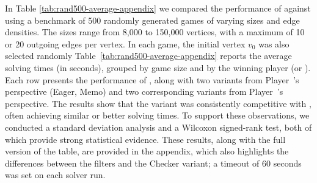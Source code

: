\documentclass[runningheads]{llncs}
\begin{document}
In Table \ref{tab:rand500-average-appendix} we compared the performance of \noc against \zra using a benchmark of 500 randomly generated games of varying sizes and edge densities. The sizes range from 8,000 to 150,000 vertices, with a maximum of 10 or 20 outgoing edges per vertex. In each game, the initial vertex $v_0$ was also selected randomly Table~\ref{tab:rand500-average-appendix} reports the average solving times (in seconds), grouped by game size and by the winning player (\even or \odd). Each row presents the performance of \zra, along with two \noc variants from Player~\even's perspective (Eager, Memo) and two corresponding variants from Player~\odd's perspective.
%
The results show that the \noceager variant was consistently competitive with \zra, often achieving similar or better solving times. To support these observations, we conducted a standard deviation analysis and a Wilcoxon signed-rank test, both of which provide strong statistical evidence. These results, along with the full version of the table, are provided in the appendix, which also highlights the differences between the \noc filters and the Checker variant; a timeout of 60 seconds was set on each solver run.
\end{document}
